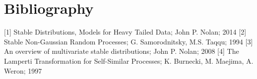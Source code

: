 \documentclass{article}
\begin{document}
\section{Bibliography}
[1] Stable Distributions, Models for Heavy Tailed Data; John P. Nolan; 2014
[2] Stable Non-Gaussian Random Processes; G. Samorodnitsky, M.S. Taqqu; 1994
[3] An overview of multivariate stable distributions; John P. Nolan; 2008
[4] The Lamperti Transformation for Self-Similar Processes; K. Burnecki, M. Maejima, A. Weron; 1997
\end{document}
